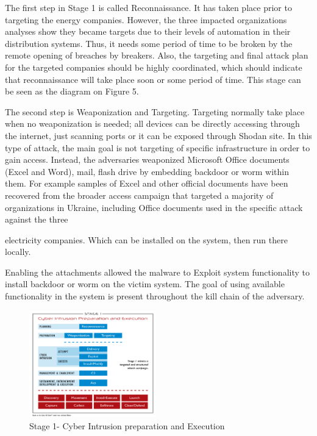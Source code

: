 \documentclass[conference]{IEEEtran}
\begin{document}
The first step in Stage 1 is called Reconnaissance. It has taken place prior to targeting the energy companies. However, the three impacted organizations analyses show they became targets due to their levels of automation in their distribution systems. Thus, it needs some period of time to be broken by the remote opening of breaches by breakers. Also, the targeting and final attack plan for
the targeted companies should be highly coordinated, which should indicate that reconnaissance will take place soon or some period of time. This stage can be seen as the diagram on Figure 5.

The second step is Weaponization and Targeting. Targeting normally take place when no weaponization is needed; all devices can be directly accessing through the internet, just scanning ports or it can be exposed through Shodan site. In this type of attack, the main goal is not targeting of specific infrastructure in order to gain access. Instead, the adversaries weaponized Microsoft Office documents (Excel and Word), mail, flash drive by embedding backdoor or worm within them. For example samples of Excel and other official documents have been recovered from the broader access campaign that targeted a majority of organizations in Ukraine, including Office documents used in the specific attack against the three

electricity companies. Which can be installed on the system, then run there locally.

Enabling the attachments allowed the malware to Exploit system functionality to install backdoor or worm on the victim system. The goal of using available functionality in the system is present throughout the kill chain of the adversary.

\begin{figure}[!htb]
	\includegraphics[width=0.49\textwidth]{STAGE1.png}
	\caption{ Stage 1- Cyber Intrusion preparation and Execution }
	\label{fig:TCPIP}
\end{figure}
\end{document}
